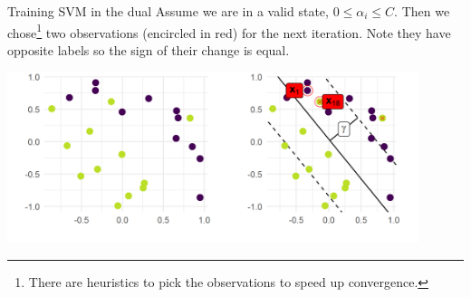 \begin{vbframe}{Training SVM in the dual}
\framebreak
\normalsize
Assume we are in a valid state, $0 \leq \alpha_i \leq C$. Then we chose\footnote{There are heuristics to pick the observations to speed up convergence.} two observations (encircled in red) for the next iteration.
Note they have opposite labels so the sign of their change is equal.

\vspace{0.2cm}
\begin{center}
\includegraphics[width = 0.9\textwidth]{figure/svm_training_01.png} \\
\end{center}

   
\end{vbframe}

